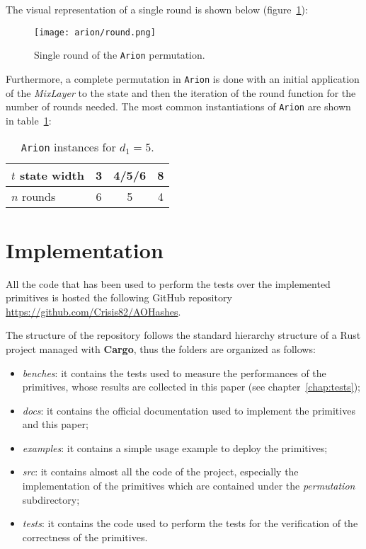 \documentclass[12pt, a4paper]{report}
\begin{document}
The visual representation of a single round is shown below (figure~\ref{fig:arion}):

\begin{figure}[H]
  \begin{center}
    \texttt{[image: arion/round.png]}
  \end{center}
  \caption{Single round of the \texttt{Arion} permutation.}\label{fig:arion}
\end{figure}

Furthermore, a complete permutation in \texttt{Arion} is done with an initial application of the \textit{MixLayer} to the state and then the iteration of the round function for the number of rounds needed.
The most common instantiations of \texttt{Arion} are shown in table~\ref{tab:aneomiinstances}:
\begin{table}[H]
  \begin{center}
    \begin{tabular}{|l|c|c|c|}
      \hline
      $t$ state width & 3 & 4/5/6 & 8 \\
      \hline
      $n$ rounds & 6 & 5 & 4 \\
      \hline
    \end{tabular}
  \end{center}
  \caption{\texttt{Arion} instances for $d_1 = 5$.}\label{tab:aneomiinstances}
\end{table}

\section{Implementation}\label{sec:implementation}

All the code that has been used to perform the tests over the implemented primitives is hosted the following GitHub repository \url{https://github.com/Crisis82/AOHashes}.

The structure of the repository follows the standard hierarchy structure of a Rust project managed with \textbf{Cargo}, thus the folders are organized as follows:
\begin{itemize}
  \item \textit{benches}: it contains the tests used to measure the performances of the primitives, whose results are collected in this paper (see chapter~\ref{chap:tests});
  \item \textit{docs}: it contains the official documentation used to implement the primitives and this paper;
  \item \textit{examples}: it contains a simple usage example to deploy the primitives;
  \item \textit{src}: it contains almost all the code of the project, especially the implementation of the primitives which are contained under the \textit{permutation} subdirectory;
  \item \textit{tests}: it contains the code used to perform the tests for the verification of the correctness of the primitives.
\end{itemize}
\end{document}
